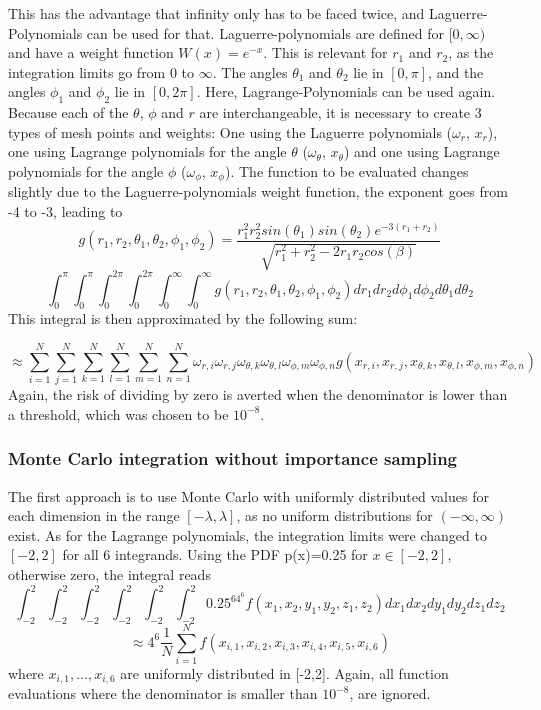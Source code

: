 \documentclass[10pt,a4paper]{article}
\begin{document}
This has the advantage that infinity only has to be faced twice, and Laguerre-Polynomials can be used for that. Laguerre-polynomials are defined for $[0,\infty)$ and have a weight function $W(x)=e^{-x}$. This is relevant for $r_1$ and $r_2$, as the integration limits go from $0$ to $\infty$. The angles $\theta_1$ and $\theta_2$ lie in $[0,\pi]$, and the angles $\phi_1$ and $\phi_2$  lie in $[0,2\pi]$. Here, Lagrange-Polynomials can be used again. Because each of the $\theta$, $\phi$ and $r$ are interchangeable, it is necessary to create 3 types of mesh points and weights: One using the Laguerre polynomials  ($\omega_r$, $x_r$), one using Lagrange polynomials for the angle $\theta$ ($\omega_\theta$, $x_\theta$) and one using Lagrange polynomials for the angle $\phi$ ($\omega_\phi$, $x_\phi$). The function to be evaluated changes slightly due to the Laguerre-polynomials weight function, the exponent goes from -4 to -3, leading to
$$g(r_1,r_2,\theta_1,\theta_2,\phi_1,\phi_2)=\frac{r_1^2r_2^2sin(\theta_1)sin(\theta_2)e^{-3(r_1+r_2)}}{\sqrt{r_1^2+r_2^2-2r_1r_2cos(\beta)}}$$
$$\int_{0}^{\pi}\int_{0}^{\pi}\int_{0}^{2\pi}\int_{0}^{2\pi}\int_{0}^{\infty}\int_{0}^{\infty}
g(r_1,r_2,\theta_1,\theta_2,\phi_1,\phi_2)dr_1dr_2d\phi_1d\phi_2d\theta_1d\theta_2$$
This integral is then approximated by the following sum:

$$
\approx \sum_{i=1}^N \sum_{j=1}^N \sum_{k=1}^N \sum_{l=1}^N \sum_{m=1}^N \sum_{n=1}^N \omega_{r,i} \omega_{r,j} \omega_{\theta ,k} \omega_{\theta ,l} \omega_{\phi ,m} \omega_{\phi ,n} g(x_{r,i},x_{r,j},x_{\theta ,k},x_{\theta ,l},x_{\phi ,m},x_{\phi ,n})
$$
Again, the risk of dividing by zero is averted when the denominator  is lower than a threshold, which was chosen to be $10^{-8}.$
\subsubsection{Monte Carlo integration without importance sampling}
The first approach is to use Monte Carlo with uniformly distributed values for each dimension in the range $[-\lambda,\lambda]$, as no uniform distributions for $(-\infty,\infty)$ exist. As for the Lagrange polynomials, the integration limits were changed  to $[-2,2]$ for all 6 integrands. Using the PDF p(x)=0.25 for $x\in [-2,2]$, otherwise zero, the integral reads 
$$\int_{-2}^{2}\int_{-2}^{2}\int_{-2}^{2}\int_{-2}^{2}\int_{-2}^{2}\int_{-2}^{2}0.25^64^6f(x_1,x_2,y_1,y_2,z_1,z_2)dx_1dx_2dy_1dy_2dz_1dz_2$$
$$\approx4^6\frac{1}{N}\sum_{i=1}^{N}f(x_{i,1},x_{i,2},x_{i,3},x_{i,4},x_{i,5},x_{i,6})$$
where $x_{i,1},...,x_
{i,6}$ are uniformly distributed in  [-2,2]. Again, all function evaluations where the denominator is smaller than $10^{-8}$, are ignored.
\end{document}
